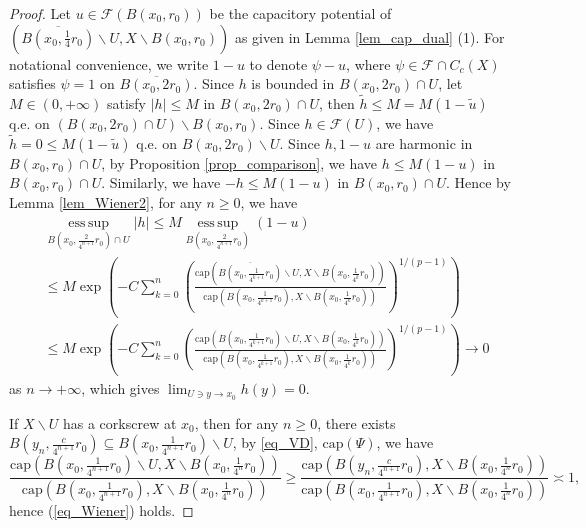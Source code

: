 \documentclass[11pt,a4paper]{article}
\numberwithin{equation}{section}
\newcommand{\esup}{\operatorname*{ess\,sup}}
\theoremstyle{plain}
\theoremstyle{definition}
\begin{document}
\begin{proof}
Let $u\in \mathcal{F}(B(x_0,r_0))$ be the capacitory potential of $(\overline{B(x_0,\frac{1}{4}r_0)}\backslash U,X\backslash B(x_0,r_0))$ as given in Lemma \ref{lem_cap_dual} (1). For notational convenience, we write $1-u$ to denote $\psi-u$, where $\psi\in \mathcal{F}\cap C_c(X)$ satisfies $\psi=1$ on $\overline{B(x_0,2r_0)}$. Since $h$ is bounded in $B(x_0,2r_0)\cap U$, let $M\in(0,+\infty)$ satisfy $\lvert h\rvert\le M$ in $B(x_0,2r_0)\cap U$, then $\widetilde{h}\le M=M(1-\widetilde{u})$ q.e. on $(B(x_0,2r_0)\cap U)\backslash B(x_0,r_0)$. Since $h\in \mathcal{F}(U)$, we have $\widetilde{h}=0\le M(1-\widetilde{u})$ q.e. on $B(x_0,2r_0)\backslash U$. Since $h, 1-u$ are harmonic in $B(x_0,r_0)\cap U$, by Proposition \ref{prop_comparison}, we have $h\le M(1-u)$ in $B(x_0,r_0)\cap U$. Similarly, we have $-h\le M(1-u)$ in $B(x_0,r_0)\cap U$. Hence by Lemma \ref{lem_Wiener2}, for any $n\ge0$, we have
\begin{align*}
&\esup_{B(x_0,\frac{2}{4^{n+1}}r_0)\cap U}\lvert h\rvert\le M\esup_{B(x_0,\frac{2}{4^{n+1}}r_0)}(1-u)\\
&\le M\exp \left(-C\sum_{k=0}^n\left(\frac{\mathrm{cap}\left(\overline{B(x_0,\frac{1}{4^{k+1}}r_0)}\backslash U,X\backslash B(x_0,\frac{1}{4^{k}}r_0)\right)}{\mathrm{cap}\left(B(x_0,\frac{1}{4^{k+1}}r_0),X\backslash B(x_0,\frac{1}{4^{k}}r_0)\right)}\right)^{1/(p-1)}\right)\\
&\le M\exp \left(-C\sum_{k=0}^n\left(\frac{\mathrm{cap}\left(B(x_0,\frac{1}{4^{k+1}}r_0)\backslash U,X\backslash B(x_0,\frac{1}{4^{k}}r_0)\right)}{\mathrm{cap}\left(B(x_0,\frac{1}{4^{k+1}}r_0),X\backslash B(x_0,\frac{1}{4^{k}}r_0)\right)}\right)^{1/(p-1)}\right)\to0
\end{align*}
as $n\to+\infty$, which gives $\lim_{U\ni y\to x_0}h(y)=0$.

If $X\backslash U$ has a corkscrew at $x_0$, then for any $n\ge0$, there exists $B(y_n,\frac{c}{4^{n+1}}r_0)\subseteq B(x_0,\frac{1}{4^{n+1}}r_0)\backslash U$, by \ref{eq_VD}, \hyperlink{eq_cap}{$\text{cap}(\Psi)$}, we have
$$\frac{\mathrm{cap}\left(B(x_0,\frac{1}{4^{n+1}}r_0)\backslash U,X\backslash B(x_0,\frac{1}{4^{n}}r_0)\right)}{\mathrm{cap}\left(B(x_0,\frac{1}{4^{n+1}}r_0),X\backslash B(x_0,\frac{1}{4^{n}}r_0)\right)}\ge\frac{\mathrm{cap}\left(B(y_n,\frac{c}{4^{n+1}}r_0),X\backslash B(x_0,\frac{1}{4^{n}}r_0)\right)}{\mathrm{cap}\left(B(x_0,\frac{1}{4^{n+1}}r_0),X\backslash B(x_0,\frac{1}{4^{n}}r_0)\right)}\asymp1,$$
hence (\ref{eq_Wiener}) holds.
\end{proof}
\end{document}
